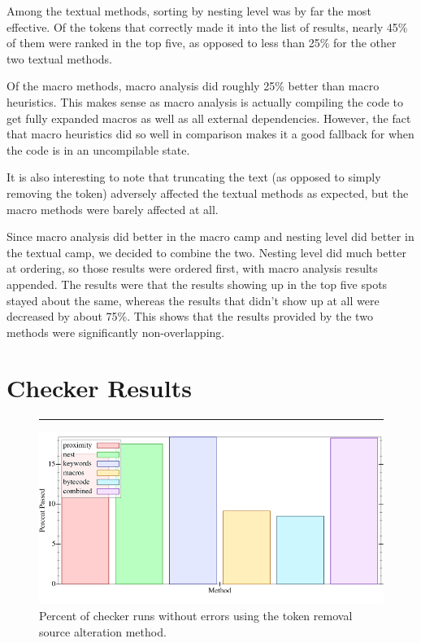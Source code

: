 \documentclass[ms,electronic,twosidetoc,letterpaper,chaptercenter,parttop,lol,lof,lot]{byumsphd}
\begin{document}
Among the textual methods, sorting by nesting level was by far the most effective.
Of the tokens that correctly made it into the list of results, nearly 45\% of them were ranked in the top five, as opposed to less than 25\% for the other two textual methods.

Of the macro methods, macro analysis did roughly 25\% better than macro heuristics.
This makes sense as macro analysis is actually compiling the code to get fully expanded macros as well as all external dependencies.
However, the fact that macro heuristics did so well in comparison makes it a good fallback for when the code is in an uncompilable state.

It is also interesting to note that truncating the text (as opposed to simply removing the token) adversely affected the textual methods as expected, but the macro methods were barely affected at all.

Since macro analysis did better in the macro camp and nesting level did better in the textual camp, we decided to combine the two.
Nesting level did much better at ordering, so those results were ordered first, with macro analysis results appended.
The results were that the results showing up in the top five spots stayed about the same, whereas the results that didn't show up at all were decreased by about 75\%.
This shows that the results provided by the two methods were significantly non-overlapping.

\section{Checker Results}

\begin{figure}[h]
\centering
\hrule
\includegraphics[width=1.0\textwidth]{../output/synthesis/checker/Remove-Percent.png}
\caption{Percent of checker runs without errors using the token removal source alteration method.}
\label{fig:checker-remove-percent}
\end{figure}
\end{document}
